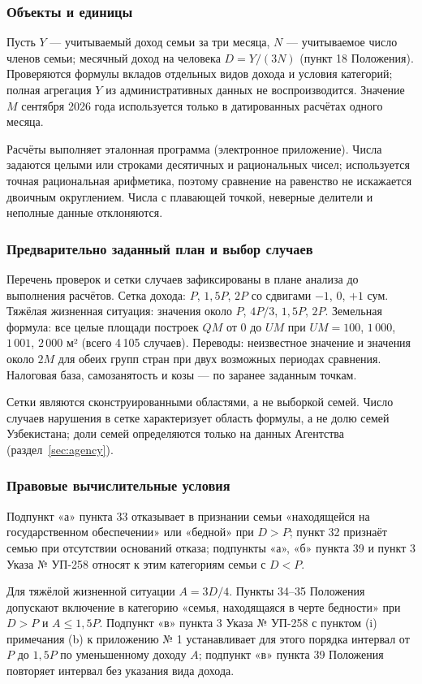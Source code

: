 \documentclass[14pt,a4paper]{extarticle}
\begin{document}
\subsubsection{Объекты и единицы}
Пусть $Y$ — учитываемый доход семьи за три месяца, $N$ — учитываемое число членов семьи; месячный доход на человека $D=Y/(3N)$ (пункт 18 Положения). Проверяются формулы вкладов отдельных видов дохода и условия категорий; полная агрегация $Y$ из административных данных не воспроизводится. Значение $M$ сентября 2026 года используется только в датированных расчётах одного месяца.

Расчёты выполняет эталонная программа (электронное приложение). Числа задаются целыми или строками десятичных и рациональных чисел; используется точная рациональная арифметика, поэтому сравнение на равенство не искажается двоичным округлением. Числа с плавающей точкой, неверные делители и неполные данные отклоняются.

\subsubsection{Предварительно заданный план и выбор случаев}
Перечень проверок и сетки случаев зафиксированы в плане анализа до выполнения расчётов. Сетка дохода: $P$, $1{,}5P$, $2P$ со сдвигами $-1$, $0$, $+1$ сум. Тяжёлая жизненная ситуация: значения около $P$, $4P/3$, $1{,}5P$, $2P$. Земельная формула: все целые площади построек $QM$ от $0$ до $UM$ при $UM=100$, $1\,000$, $1\,001$, $2\,000$ м² (всего 4\,105 случаев). Переводы: неизвестное значение и значения около $2M$ для обеих групп стран при двух возможных периодах сравнения. Налоговая база, самозанятость и козы — по заранее заданным точкам.

Сетки являются сконструированными областями, а не выборкой семей. Число случаев нарушения в сетке характеризует область формулы, а не долю семей Узбекистана; доли семей определяются только на данных Агентства (раздел~\ref{sec:agency}).

\subsubsection{Правовые вычислительные условия}
Подпункт «а» пункта 33 отказывает в признании семьи «находящейся на государственном обеспечении» или «бедной» при $D>P$; пункт 32 признаёт семью при отсутствии оснований отказа; подпункты «а», «б» пункта 39 и пункт 3 Указа № УП-258 относят к этим категориям семьи с $D<P$\cite{res35,pf258}.

Для тяжёлой жизненной ситуации $A=3D/4$. Пункты 34–35 Положения допускают включение в категорию «семья, находящаяся в черте бедности» при $D>P$ и $A\le1{,}5P$. Подпункт «в» пункта 3 Указа № УП-258 с пунктом (i) примечания (b) к приложению № 1 устанавливает для этого порядка интервал от $P$ до $1{,}5P$ по уменьшенному доходу $A$; подпункт «в» пункта 39 Положения повторяет интервал без указания вида дохода.
\end{document}
